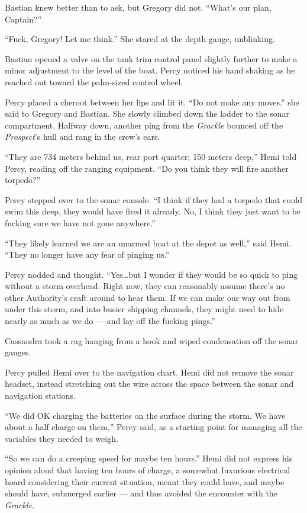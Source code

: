 \documentclass[
]{scrbook}
\begin{document}
Bastian knew better than to ask, but Gregory did not. ``What's our plan,
Captain?''

``Fuck, Gregory! Let me think.'' She stared at the depth gauge,
unblinking.

Bastian opened a valve on the tank trim control panel slightly further
to make a minor adjustment to the level of the boat. Percy noticed his
hand shaking as he reached out toward the palm-sized control wheel.

Percy placed a cheroot between her lips and lit it. ``Do not make any
moves.'' she said to Gregory and Bastian. She slowly climbed down the
ladder to the sonar compartment. Halfway down, another ping from the
\emph{Grackle} bounced off the \emph{Prospect}'s hull and rang in the
crew's ears.

``They are 734 meters behind us, rear port quarter; 150 meters deep,''
Hemi told Percy, reading off the ranging equipment. ``Do you think they
will fire another torpedo?''

Percy stepped over to the sonar console. ``I think if they had a torpedo
that could swim this deep, they would have fired it already. No, I think
they just want to be fucking sure we have not gone anywhere.''

``They likely learned we are an unarmed boat at the depot as well,''
said Hemi. ``They no longer have any fear of pinging us.''

Percy nodded and thought. ``Yes\ldots but I wonder if they would be so
quick to ping without a storm overhead. Right now, they can reasonably
assume there's no other Authority's craft around to hear them. If we can
make our way out from under this storm, and into busier shipping
channels, they might need to hide nearly as much as we do --- and lay
off the fucking pings.''

Cassandra took a rag hanging from a hook and wiped condensation off the
sonar gauges.

Percy pulled Hemi over to the navigation chart. Hemi did not remove the
sonar headset, instead stretching out the wire across the space between
the sonar and navigation stations.

``We did OK charging the batteries on the surface during the storm. We
have about a half charge on them,'' Percy said, as a starting point for
managing all the variables they needed to weigh.

``So we can do a creeping speed for maybe ten hours.'' Hemi did not
express his opinion aloud that having ten hours of charge, a somewhat
luxurious electrical hoard considering their current situation, meant
they could have, and maybe should have, submerged earlier --- and thus
avoided the encounter with the \emph{Grackle}.
\end{document}
